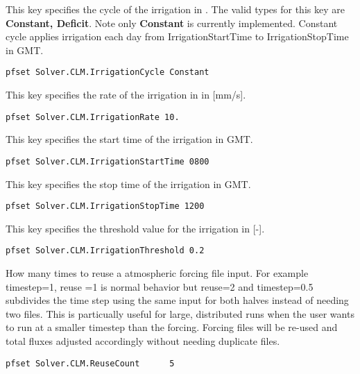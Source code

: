 {This key specifies the cycle of the irrigation in .  The valid types for this key are {\bf Constant, Deficit}. Note only {\bf Constant} is currently implemented.  Constant cycle applies irrigation each day from IrrigationStartTime to IrrigationStopTime in GMT.
} 
\begin{display}\begin{verbatim}
pfset Solver.CLM.IrrigationCycle Constant
\end{verbatim}\end{display}

{This key specifies the rate of the irrigation in  in [mm/s].  
} 
\begin{display}\begin{verbatim}
pfset Solver.CLM.IrrigationRate 10.
\end{verbatim}\end{display}

{This key specifies the start time of the irrigation in  GMT.  
} 
\begin{display}\begin{verbatim}
pfset Solver.CLM.IrrigationStartTime 0800
\end{verbatim}\end{display}

{This key specifies the stop time of the irrigation in  GMT.  
} 
\begin{display}\begin{verbatim}
pfset Solver.CLM.IrrigationStopTime 1200
\end{verbatim}\end{display}

{This key specifies the threshold value for the irrigation in  [-].  
} 
\begin{display}\begin{verbatim}
pfset Solver.CLM.IrrigationThreshold 0.2
\end{verbatim}\end{display}

{How many times to reuse a  atmospheric forcing file input. For example timestep=1, 
reuse =1 is normal behavior but reuse=2 and timestep=0.5 subdivides 
the time step using the same  input for both halves instead of needing two files.
This is particually useful for large, distributed runs when the user wants to run \parflow{}
at a smaller timestep than the  forcing.  Forcing files will be re-used and
total fluxes adjusted accordingly without needing duplicate files.} 
\begin{display}\begin{verbatim}
pfset Solver.CLM.ReuseCount      5
\end{verbatim}\end{display}

